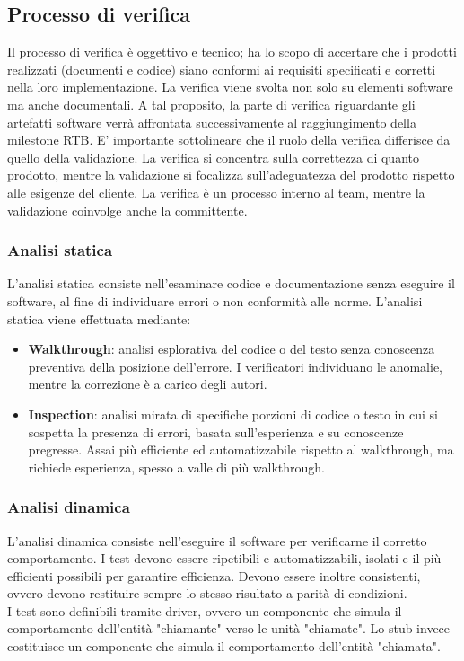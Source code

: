 \documentclass[a4paper,12pt]{article}
\begin{document}
\subsection{Processo di verifica}
Il processo di verifica è oggettivo e tecnico; ha lo scopo di accertare che i prodotti realizzati
(documenti e codice) siano conformi ai requisiti specificati e corretti nella loro implementazione.
La verifica viene svolta non solo su elementi software ma anche documentali.
A tal proposito, la parte di verifica riguardante gli artefatti software verrà affrontata successivamente al
raggiungimento della milestone RTB. E' importante sottolineare che il ruolo
della verifica differisce da quello della validazione. La verifica si concentra
sulla correttezza di quanto prodotto, mentre la validazione si focalizza
sull'adeguatezza del prodotto rispetto alle esigenze del cliente. La verifica è
un processo interno al team, mentre la validazione coinvolge anche la
committente.

\subsubsection{Analisi statica}
L'analisi statica consiste nell'esaminare codice e documentazione senza
eseguire il software, al fine di individuare errori o non conformità alle norme. L'analisi statica viene effettuata mediante:
\begin{itemize}
    \item \textbf{Walkthrough}: analisi esplorativa del codice o del testo senza conoscenza preventiva della posizione dell'errore. I verificatori individuano le anomalie, mentre la correzione è a carico degli autori.

    \item \textbf{Inspection}: analisi mirata di specifiche porzioni di codice o testo in cui si sospetta la presenza di errori, basata sull'esperienza e su conoscenze pregresse. Assai più efficiente ed automatizzabile rispetto al walkthrough, ma richiede esperienza, spesso a valle di più walkthrough.
\end{itemize}

\subsubsection{Analisi dinamica}
L'analisi dinamica consiste nell'eseguire il software per verificarne il
corretto comportamento. I test devono essere
ripetibili e automatizzabili, isolati e il più efficienti possibili per garantire
efficienza. Devono essere inoltre consistenti, ovvero devono restituire sempre lo stesso risultato a parità di condizioni.\\
I test sono definibili tramite driver, ovvero un componente che simula il comportamento dell'entità "chiamante" verso le unità "chiamate". Lo stub invece costituisce un componente che simula il comportamento dell'entità "chiamata".
\end{document}
